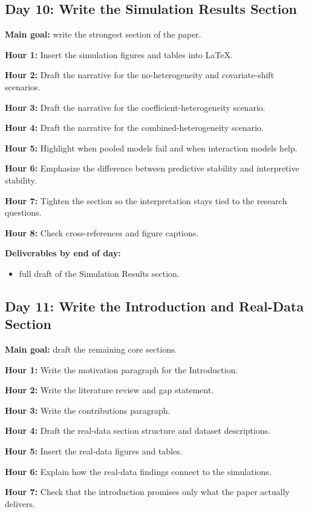\documentclass[11pt]{article}
\begin{document}
\subsection*{Day 10: Write the Simulation Results Section}
\textbf{Main goal:} write the strongest section of the paper.

\textbf{Hour 1:} Insert the simulation figures and tables into LaTeX.

\textbf{Hour 2:} Draft the narrative for the no-heterogeneity and covariate-shift scenarios.

\textbf{Hour 3:} Draft the narrative for the coefficient-heterogeneity scenario.

\textbf{Hour 4:} Draft the narrative for the combined-heterogeneity scenario.

\textbf{Hour 5:} Highlight when pooled models fail and when interaction models help.

\textbf{Hour 6:} Emphasize the difference between predictive stability and interpretive stability.

\textbf{Hour 7:} Tighten the section so the interpretation stays tied to the research questions.

\textbf{Hour 8:} Check cross-references and figure captions.

\textbf{Deliverables by end of day:}
\begin{itemize}
    \item full draft of the Simulation Results section.
\end{itemize}

\subsection*{Day 11: Write the Introduction and Real-Data Section}
\textbf{Main goal:} draft the remaining core sections.

\textbf{Hour 1:} Write the motivation paragraph for the Introduction.

\textbf{Hour 2:} Write the literature review and gap statement.

\textbf{Hour 3:} Write the contributions paragraph.

\textbf{Hour 4:} Draft the real-data section structure and dataset descriptions.

\textbf{Hour 5:} Insert the real-data figures and tables.

\textbf{Hour 6:} Explain how the real-data findings connect to the simulations.

\textbf{Hour 7:} Check that the introduction promises only what the paper actually delivers.
\end{document}
